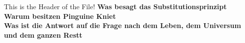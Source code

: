 This is the Header of the File!
\textbf{Was besagt das Substitutionsprinzipt}\\
\textbf{Warum besitzen Pinguine Kniet}\\
\textbf{Was ist die Antwort auf die Frage nach dem Leben, dem Universum und dem ganzen Restt}\\

